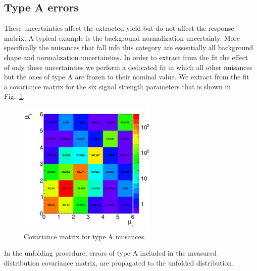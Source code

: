 \subsection{Type A errors}
These uncertainties affect the extracted yield but do not affect the response matrix. A typical example is the background normalization uncertainty. More specifically the nuisances that fall info this category are essentially all background shape and normalization uncertainties.
In order to extract from the fit the effect of only these uncertainties we perform a dedicated fit in which all other nuisances but the ones of type A are frozen to their nominal value. We extract from the fit a covariance matrix for the six signal strength parameters that is shown in Fig.~\ref{fig:covariance_matrix}.
\begin{figure}[htb]
\centering
\includegraphics[width=0.6\textwidth]{images/covariance_matrix.pdf}
\caption{Covariance matrix for type A nuisances.\label{fig:covariance_matrix}}
\end{figure}

In the unfolding procedure, errors of type A included in the measured distribution covariance matrix, are propagated to the unfolded distribution.


